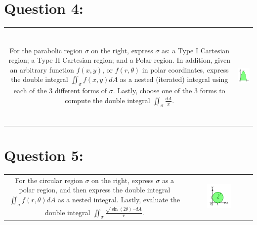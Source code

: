 \documentclass{article}
\begin{document}
\section*{Question 4:}

\begin{tabular}{cc}
\parbox{0.6\textwidth}{For the parabolic region \(\sigma\) on the right, express \(\sigma\) as: a Type I Cartesian region; a Type II Cartesian region; and a Polar region. In addition, given an arbitrary function \(f(x,y)\), or \(f(r,\theta)\) in polar coordinates, express the double integral \(\iint_{\sigma} f(x,y)dA\) as a nested (iterated) integral using each of the 3 different forms of \(\sigma\). Lastly, choose one of the 3 forms to compute the double integral \(\iint_{\sigma} \frac{dA}{x}\).}
& 
\parbox{0.4\textwidth}{\includegraphics[height = 5cm]{Test_bench_part_3_images/Test_bench_part_3_image_1}}
\end{tabular}



\section*{Question 5:}

\begin{tabular}{cc}
\parbox{0.6\textwidth}{For the circular region \(\sigma\) on the right, express \(\sigma\) as a polar region, and then express the double integral \(\iint_{\sigma} f(r,\theta)dA\) as a nested integral. Lastly, evaluate the double integral \(\iint_{\sigma} \frac{\sqrt{\sin(2\theta)} \cdot dA}{r}\).} 
&
\parbox{0.4\textwidth}{\includegraphics[width = 0.4\textwidth]{Test_bench_part_3_images/Test_bench_part_3_image_2}}
\end{tabular}
\end{document}

